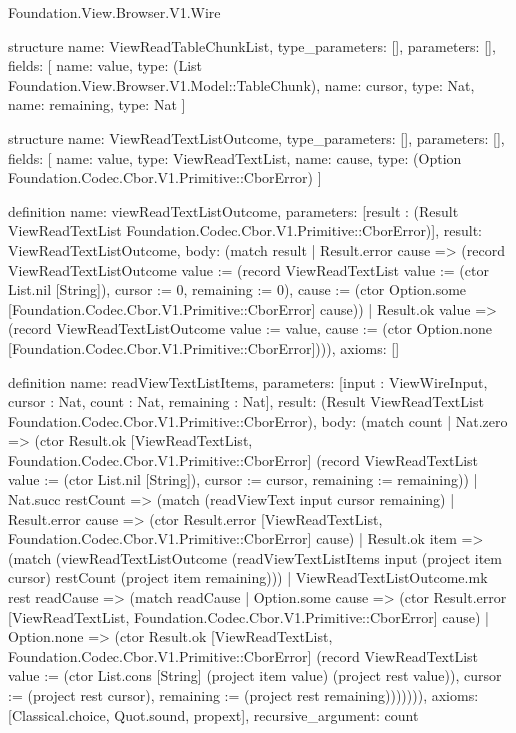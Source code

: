 \begin{lexlean}{Foundation.View.Browser.V1.Wire}
\begin{semanticmodule}
structure{
  name: ViewReadTableChunkList,
  type_parameters: [],
  parameters: [],
  fields: [
    {name: value, type: (List Foundation.View.Browser.V1.Model::TableChunk)},
    {name: cursor, type: Nat},
    {name: remaining, type: Nat}
  ]
}

structure{
  name: ViewReadTextListOutcome,
  type_parameters: [],
  parameters: [],
  fields: [
    {name: value, type: ViewReadTextList},
    {name: cause, type: (Option Foundation.Codec.Cbor.V1.Primitive::CborError)}
  ]
}

definition{
  name: viewReadTextListOutcome,
  parameters: [result : (Result ViewReadTextList Foundation.Codec.Cbor.V1.Primitive::CborError)],
  result: ViewReadTextListOutcome,
  body: (match result
    | Result.error cause => (record ViewReadTextListOutcome {value := (record ViewReadTextList {value := (ctor List.nil [String]), cursor := 0, remaining := 0}), cause := (ctor Option.some [Foundation.Codec.Cbor.V1.Primitive::CborError] cause)})
    | Result.ok value => (record ViewReadTextListOutcome {value := value, cause := (ctor Option.none [Foundation.Codec.Cbor.V1.Primitive::CborError])})),
  axioms: []
}

definition{
  name: readViewTextListItems,
  parameters: [input : ViewWireInput, cursor : Nat, count : Nat, remaining : Nat],
  result: (Result ViewReadTextList Foundation.Codec.Cbor.V1.Primitive::CborError),
  body: (match count
    | Nat.zero => (ctor Result.ok [ViewReadTextList, Foundation.Codec.Cbor.V1.Primitive::CborError] (record ViewReadTextList {value := (ctor List.nil [String]), cursor := cursor, remaining := remaining}))
    | Nat.succ restCount => (match (readViewText input cursor remaining)
      | Result.error cause => (ctor Result.error [ViewReadTextList, Foundation.Codec.Cbor.V1.Primitive::CborError] cause)
      | Result.ok item => (match (viewReadTextListOutcome (readViewTextListItems input (project item cursor) restCount (project item remaining)))
        | ViewReadTextListOutcome.mk rest readCause => (match readCause
          | Option.some cause => (ctor Result.error [ViewReadTextList, Foundation.Codec.Cbor.V1.Primitive::CborError] cause)
          | Option.none => (ctor Result.ok [ViewReadTextList, Foundation.Codec.Cbor.V1.Primitive::CborError] (record ViewReadTextList {value := (ctor List.cons [String] (project item value) (project rest value)), cursor := (project rest cursor), remaining := (project rest remaining)})))))),
  axioms: [Classical.choice, Quot.sound, propext],
  recursive_argument: count
}


\end{semanticmodule}
\end{lexlean}
